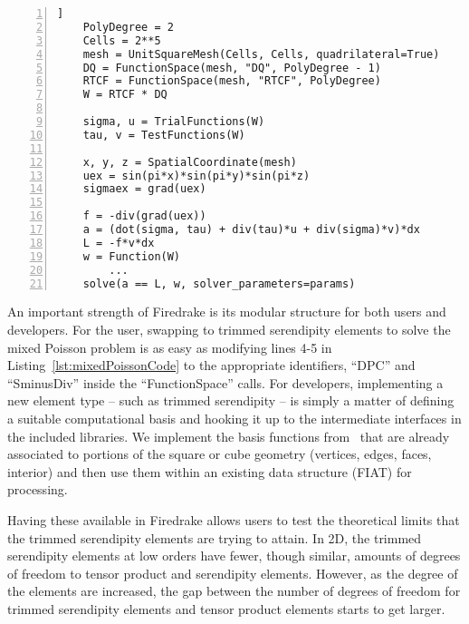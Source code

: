 \documentclass[manuscript,screen]{acmart}
\begin{document}
  \lstset{language=Python}
  \lstset{basicstyle=\footnotesize\ttfamily,breaklines=true}
  \begin{lstlisting}[frame=single, caption={Basic Firedrake implementation of the mixed Poisson problem.}, label={lst:mixedPoissonCode}, numbers=left, firstnumber=1, xleftmargin=20pt, xrightmargin=20pt]]
    PolyDegree = 2
    Cells = 2**5
    mesh = UnitSquareMesh(Cells, Cells, quadrilateral=True)
    DQ = FunctionSpace(mesh, "DQ", PolyDegree - 1)
    RTCF = FunctionSpace(mesh, "RTCF", PolyDegree)
    W = RTCF * DQ
    
    sigma, u = TrialFunctions(W)
    tau, v = TestFunctions(W)
    
    x, y, z = SpatialCoordinate(mesh)
    uex = sin(pi*x)*sin(pi*y)*sin(pi*z)
    sigmaex = grad(uex)
    
    f = -div(grad(uex))
    a = (dot(sigma, tau) + div(tau)*u + div(sigma)*v)*dx
    L = -f*v*dx
    w = Function(W)
        ...
    solve(a == L, w, solver_parameters=params)
  \end{lstlisting}
  
  
	An important strength of Firedrake is its modular structure for both users and developers.
   For the user, swapping to trimmed serendipity elements to solve the mixed Poisson problem is as easy as modifying lines 4-5 in Listing~\ref{lst:mixedPoissonCode} to the appropriate identifiers, ``DPC'' and ``SminusDiv'' inside the ``FunctionSpace'' calls.  
   For developers, implementing a new element type -- such as trimmed serendipity -- is simply a matter of defining a suitable computational basis and hooking it up to the intermediate interfaces in the included libraries.  We implement the basis functions from~\cite{gillette2019computational} that are already associated to portions of the square or cube geometry (vertices, edges, faces, interior) and then use them within an existing data structure (FIAT) for processing.
   
   Having these available in Firedrake allows users to test the theoretical limits that the trimmed serendipity elements are trying to attain.  In 2D, the trimmed serendipity elements at low orders have fewer, though similar, amounts of degrees of freedom to tensor product and serendipity elements.  However, as the degree of the elements are increased, the gap between the number of degrees of freedom for trimmed serendipity elements and tensor product elements starts to get larger.  
   
\end{document}
